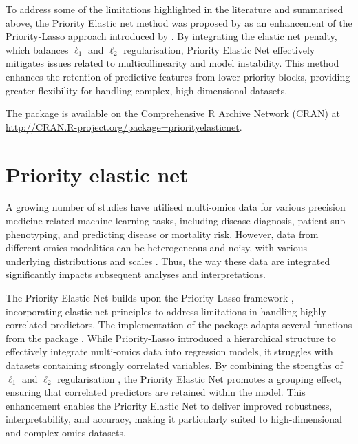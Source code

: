 To address some of the limitations highlighted in the literature and summarised above, the Priority Elastic net method was proposed by \cite{musib2024priority} as an enhancement of the Priority-Lasso approach introduced by \cite{Klau2018prioritylasso}. By integrating the elastic net penalty, which balances $\ell_1$ and $\ell_2$ regularisation, Priority Elastic Net effectively mitigates issues related to multicollinearity and model instability. This method enhances the retention of predictive features from lower-priority blocks, providing greater flexibility for handling complex, high-dimensional datasets.

The  package \citep{musib2025priorityelasticnet} is available on the Comprehensive R Archive Network (CRAN) at \url{http://CRAN.R-project.org/package=priorityelasticnet}.

\hypertarget{Priority elastic net}{%
\section{Priority elastic net} \label{sec:models}}
A growing number of studies have utilised multi-omics data for various precision medicine-related machine learning tasks, including disease diagnosis, patient sub-phenotyping, and predicting disease or mortality risk. However, data from different omics modalities can be heterogeneous and noisy, with various underlying distributions and scales \citep{huang2017more}. Thus, the way these data are integrated significantly impacts subsequent analyses and interpretations.

The Priority Elastic Net \citep{musib2025priorityelasticnet} builds upon the Priority-Lasso framework \citep{Klau2018prioritylasso}, incorporating elastic net principles to address limitations in handling highly correlated predictors. The implementation of the  package adapts several functions from the  package \citep{Klau2018prioritylasso,klau2017prioritylasso}. While Priority-Lasso introduced a hierarchical structure to effectively integrate multi-omics data into regression models, it struggles with datasets containing strongly correlated variables. By combining the strengths of \(\ell_1\) and \(\ell_2\) regularisation \citep{Zou2005elasticnet}, the Priority Elastic Net promotes a grouping effect, ensuring that correlated predictors are retained within the model. This enhancement enables the Priority Elastic Net to deliver improved robustness, interpretability, and accuracy, making it particularly suited to high-dimensional and complex omics datasets.

